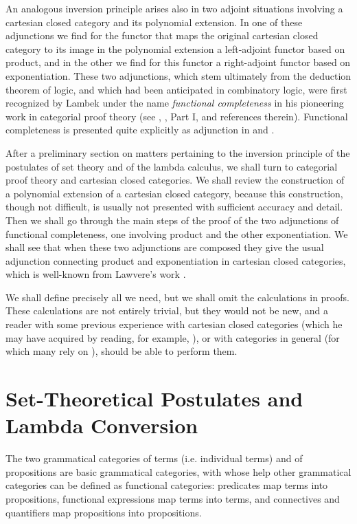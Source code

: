 An analogous inversion principle arises also in two adjoint situations
involving a cartesian closed category and its polynomial extension. In one
of these adjunctions we find for the functor that maps the original
cartesian closed category to its image in the polynomial extension a
left-adjoint functor based on product, and in the other we find for this
functor a right-adjoint functor based on exponentiation. These two
adjunctions, which stem ultimately from the deduction theorem of logic, and
which had been anticipated in combinatory logic, were first recognized by
Lambek under the name {\it functional completeness} in his pioneering work
in categorial proof theory (see \cite{Lam74}, \cite{LS86}, Part I, and
references therein). Functional completeness is presented quite explicitly
as adjunction in \cite{Jac95} and \cite{D.96}.

After a preliminary section on matters pertaining to the inversion principle
of the postulates of set theory and of the lambda calculus, we shall turn to
categorial proof theory and cartesian closed categories. We shall review the
construction of a polynomial extension of a cartesian closed category,
because this construction, though not difficult, is usually not presented
with sufficient accuracy and detail. Then we shall go through the main steps
of the proof of the two adjunctions of functional completeness, one
involving product and the other exponentiation. We shall see that when these
two adjunctions are composed they give the usual adjunction connecting
product and exponentiation in cartesian closed categories, which is
well-known from Lawvere's work \cite{Law69}.

We shall define precisely all we need, but we shall omit the calculations in
proofs. These calculations are not entirely trivial, but they would not be
new, and a reader with some previous experience with cartesian closed
categories (which he may have acquired by reading, for example, \cite{LS86}%
), or with categories in general (for which many rely on \cite{McL71}),
should be able to perform them.

\section{Set-Theoretical Postulates and Lambda Conversion}

\noindent The two grammatical categories of terms (i.e. individual terms)
and of propositions are basic grammatical categories, with whose help other
grammatical categories can be defined as functional categories: predicates
map terms into propositions, functional expressions map terms into terms,
and connectives and quantifiers map propositions into propositions.

